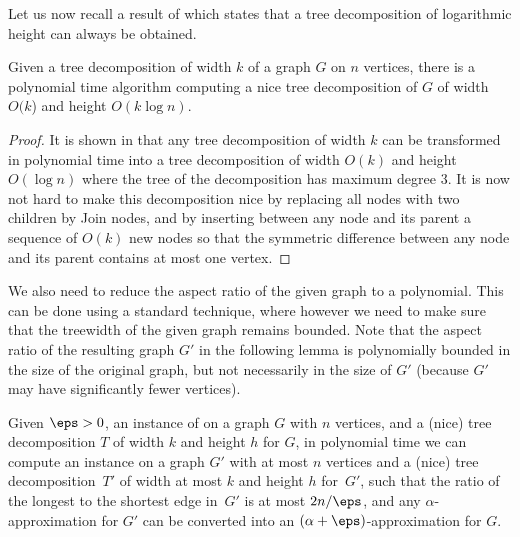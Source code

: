 Let us now recall a result of \citet{BodlaenderH98} which states that a tree
decomposition of logarithmic height can always be obtained.

\begin{lemma}\label{lem:nice-tree-decomp}
%
%
Given a tree decomposition of width $k$ of a graph $G$ on $n$ vertices, there is a
polynomial time algorithm computing a nice tree decomposition of $G$ of
width $O(k$) and height $O(k\log n)$.  \end{lemma}

%
\begin{proof}%
It is shown in \cite{BodlaenderH98} that any tree decomposition
of width $k$ can be transformed in polynomial time into a tree decomposition of
width $O(k)$ and height $O(\log n)$ where the tree of the decomposition has
maximum degree $3$. It is now not hard to make this decomposition nice by
replacing all nodes with two children by Join nodes, and by inserting between
any node and its parent a sequence of $O(k)$ new nodes so that the symmetric
difference between any node and its parent contains at most one vertex.
\end{proof} 
%

We also need to reduce the aspect ratio of the given graph to a polynomial.
This can be done using a standard technique, where however we need to make
sure that the treewidth of the given graph remains bounded.  
Note that the aspect ratio of the resulting graph $G'$ in the following lemma
is polynomially bounded in the size of the original graph, 
but not necessarily in the size of $G'$  (because $G'$ may have
significantly fewer vertices).
%
%
%
%
%
%

\begin{lemma}\label{lem:aspect-ratio} %
Given $\eps>0$, an instance of \SF on a
graph $G$ with $n$ vertices, and a (nice) tree decomposition $T$ of width $k$
and height $h$ for $G$, in polynomial time we can compute an instance on a
graph $G'$ with at most $n$ vertices and a (nice) tree decomposition~$T'$ of
width at most $k$ and height $h$ for~$G'$, such that the ratio of the longest
to the shortest edge in~$G'$ is at most $2n/\eps$, and any
$\alpha$-approximation for $G'$ can be converted into an
$(\alpha+\eps)$-approximation for $G$.  
\end{lemma} 

